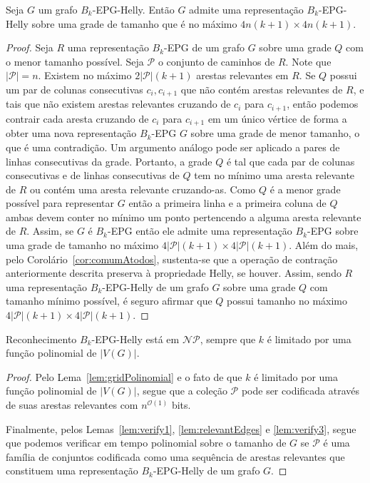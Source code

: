 \medskip


\begin{lemma}\label{lem:gridPolinomial}
Seja $G$ um grafo $B_k$-EPG-Helly. Então $G$ admite uma representação $B_k$-EPG-Helly sobre uma grade de tamanho que é no máximo $4n(k+1) \times 4n(k+1)$.
\end{lemma}
\begin{proof}
Seja $R$ uma representação $B_k$-EPG de um grafo $G$ sobre uma grade $Q$ com o menor tamanho possível.
Seja $\mathcal{P}$ o conjunto de caminhos de  $R$. Note que $|\mathcal{P}|=n$.
 Existem no máximo $2|\mathcal{P}|(k+1)$ arestas relevantes em  $R$. 
 Se $Q$ possui um par de colunas consecutivas $c_i,c_{i+1}$ que não contém arestas relevantes de  $R$, e tais que não existem arestas relevantes cruzando de $c_i$ para $c_{i+1}$, então podemos contrair cada aresta cruzando de $c_i$ para $c_{i+1}$ em um único vértice de forma a obter uma nova representação  $B_k$-EPG  $G$ sobre uma grade de menor tamanho, o que é uma contradição. Um argumento análogo pode ser aplicado a pares de linhas consecutivas da grade.
  Portanto, a grade  $Q$ é tal que cada par de colunas consecutivas e de linhas consecutivas de  $Q$ tem no mínimo uma aresta relevante de $R$ ou contém uma aresta relevante cruzando-as.  
  Como $Q$ é a menor grade possível para representar  $G$ então a primeira linha e a primeira coluna de $Q$ ambas devem conter no mínimo um ponto  pertencendo a alguma aresta relevante de $R$. 
Assim, se $G$ é $B_k$-EPG então ele admite uma  representação $B_k$-EPG sobre uma grade de tamanho no máximo $4|\mathcal{P}|(k+1) \times 4|\mathcal{P}|(k+1)$.
Além do mais, pelo  Corolário~\ref{cor:comumAtodos}, sustenta-se que a operação de contração anteriormente descrita preserva à propriedade Helly, se houver. Assim, sendo $R$ uma representação $B_k$-EPG-Helly de um grafo $G$ sobre uma grade $Q$ com tamanho mínimo possível, é seguro afirmar que $Q$ possui tamanho no máximo  $4|\mathcal{P}|(k+1) \times 4|\mathcal{P}|(k+1)$.
\end{proof}

\begin{theorem}\label{teo:nppertinencia}
{\sc Reconhecimento $B_k$-EPG-Helly} está em  $\mathcal{NP}$, sempre que $k$ é limitado por uma função polinomial de $|V(G)|$.
\end{theorem}
\begin{proof}
Pelo Lema~\ref{lem:gridPolinomial} e o fato de que $k$ é limitado por uma função polinomial de  $|V(G)|$, segue que a coleção  $\mathcal{P}$ pode ser codificada através de suas arestas relevantes com   $n^{\mathcal{O}(1)}$ bits.

Finalmente, pelos Lemas~\ref{lem:verify1}, \ref{lem:relevantEdges} e \ref{lem:verify3}, segue que podemos verificar em tempo polinomial sobre o tamanho de $G$ se $\mathcal{P}$ é uma família de conjuntos codificada como uma sequência de arestas relevantes que constituem uma representação $B_k$-EPG-Helly de um grafo  $G$.
\end{proof}

